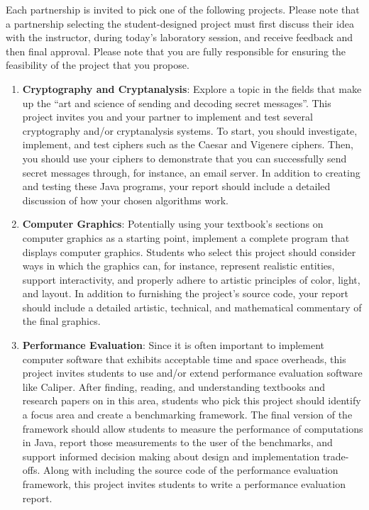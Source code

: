 Each partnership is invited to pick one of the following projects.  Please note that a partnership selecting the
student-designed project must first discuss their idea with the instructor, during today's laboratory session, and
receive feedback and then final approval.  Please note that you are fully responsible for ensuring the feasibility of
the project that you propose.

\begin{enumerate}

  \item {\bf Cryptography and Cryptanalysis}: Explore a topic in the fields that make up the ``art and science of
    sending and decoding secret messages''. This project invites you and your partner to implement and test several cryptography
    and/or cryptanalysis systems.  To start, you should investigate, implement, and test ciphers such as the Caesar and
    Vigenere ciphers. Then, you should use your ciphers to demonstrate that you can successfully send secret messages
    through, for instance, an email server. In addition to creating and testing these Java programs, your report should
    include a detailed discussion of how your chosen algorithms work.

  \item {\bf Computer Graphics}: Potentially using your textbook's sections on computer graphics as a starting point,
    implement a complete program that displays computer graphics.  Students who select this project should consider ways
    in which the graphics can, for instance, represent realistic entities, support interactivity, and properly adhere to
    artistic principles of color, light, and layout. In addition to furnishing the project's source code, your report
    should include a detailed artistic, technical, and mathematical commentary of the final graphics.

  \item {\bf Performance Evaluation}: Since it is often important to implement computer software that exhibits
    acceptable time and space overheads, this project invites students to use and/or extend performance evaluation
    software like Caliper.  After finding, reading, and understanding textbooks and research papers on in this area,
    students who pick this project should identify a focus area and create a benchmarking framework.  The
    final version of the framework should allow students to measure the performance of computations in Java, report
    those measurements to the user of the benchmarks, and support informed decision making about design and
    implementation trade-offs.  Along with including the source code of the performance evaluation framework, this
    project invites students to write a performance evaluation report.


\end{enumerate}
